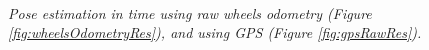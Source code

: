 \begin{figure}
	\centering
	 \\
	\caption{\textit{Pose estimation in time using raw wheels odometry (Figure \ref{fig:wheelsOdometryRes}), and using GPS (Figure \ref{fig:gpsRawRes}).}}
	\label{fig:sensorFusionInputs}
\end{figure}

